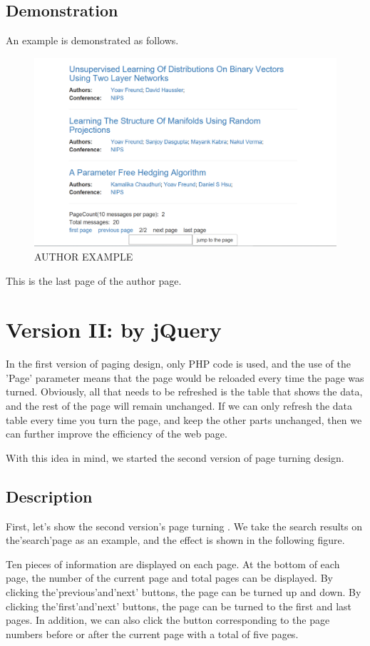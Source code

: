 \documentclass{book}
\begin{document}
\subsection{Demonstration}
An example is demonstrated as follows.
\begin{figure}[H]
\centering
\includegraphics[scale=0.15]{img/dsw_ex.png}
\caption{AUTHOR EXAMPLE}
\end{figure}
This is the last page of the author page.

\section{Version II: by jQuery}
In the first version of paging design, only PHP code is used, and the use of the 'Page' parameter means that the page would be reloaded every time the page was turned. Obviously, all that needs to be refreshed is the table that shows the data, and the rest of the page will remain unchanged. If we can only refresh the data table every time you turn the page, and keep the other parts unchanged, then we can further improve the efficiency of the web page. 

With this idea in mind, we started the second version of page turning design.

\subsection{Description}
First, let's show the second version's page turning . We take the search results on the'search'page as an example, and the effect is shown in the following figure.

Ten pieces of information are displayed on each page. At the bottom of each page, the number of the current page and total pages can be displayed. By clicking the'previous'and'next' buttons, the page can be turned up and down. By clicking the'first'and'next' buttons, the page can be turned to the first and last pages. In addition, we can also click the button corresponding to the page numbers before or after the current page with a total of five pages.
\end{document}
